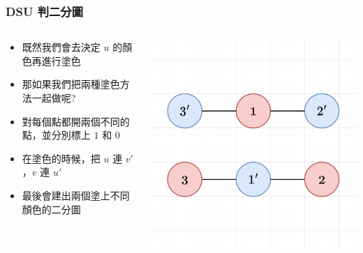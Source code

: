 \documentclass[aspectratio=169]{beamer}
\begin{document}
    \begin{frame}
        \frametitle{DSU 判二分圖}
        \begin{columns}
            \begin{column}{0.6 \textwidth}
                \begin{itemize}
                    \item 既然我們會去決定 $u$ 的顏色再進行塗色
                    \item 那如果我們把兩種塗色方法一起做呢?
                    \item 對每個點都開兩個不同的點，並分別標上 $1$ 和 $0$
                    \item 在塗色的時候，把 $u$ 連 $v'$，$v$ 連 $u'$
                    \item 最後會建出兩個塗上不同顏色的二分圖
                \end{itemize}
            \end{column}
            \begin{column}{0.4 \textwidth}
                \begin{center}
                    \includegraphics[scale=0.3]{images/bipartite_dsu.png}
                \end{center}
            \end{column}
        \end{columns}
    \end{frame}
    
\end{document}
